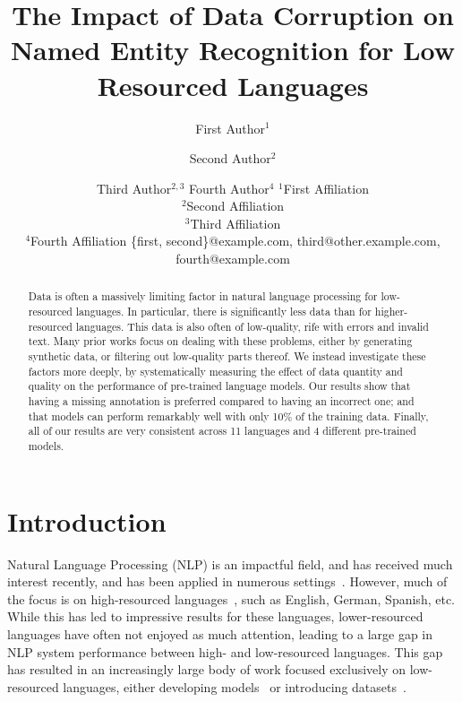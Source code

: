\documentclass{article}
\title{The Impact of Data Corruption on Named Entity Recognition for Low Resourced Languages}
\author{
First Author$^1$
\and
Second Author$^2$\and
Third Author$^{2,3}$\And
Fourth Author$^4$
\affiliations
$^1$First Affiliation\\
$^2$Second Affiliation\\
$^3$Third Affiliation\\
$^4$Fourth Affiliation
\emails
\{first, second\}@example.com,
third@other.example.com,
fourth@example.com
}
\begin{document}
\maketitle

\begin{abstract}
    Data is often a massively limiting factor in natural language processing for low-resourced languages. In particular, there is significantly less data than for higher-resourced languages. This data is also often of low-quality, rife with errors and invalid text. Many prior works focus on dealing with these problems, either by generating synthetic data, or filtering out low-quality parts thereof. We instead investigate these factors more deeply, by systematically measuring the effect of data quantity and quality on the performance of pre-trained language models. Our results show that having a missing annotation is preferred compared to having an incorrect one; and that models can perform remarkably well with only 10\% of the training data. Finally, all of our results are very consistent across 11 languages and 4 different pre-trained models.
\end{abstract}

\section{Introduction}
Natural Language Processing (NLP) is an impactful field, and has received much interest recently, and has been applied in numerous settings~\citep{vaswani2017Attention,conneau2019Unsupervised}.
However, much of the focus is on high-resourced languages~\citep{vaswani2017Attention,conneau2019Unsupervised,radford2018Improving,radford2019language_gpt2}, such as English, German, Spanish, etc. While this has led to impressive results for these languages, lower-resourced languages have often not enjoyed as much attention, leading to a large gap in NLP system performance between high- and low-resourced languages. This gap has resulted in an increasingly large body of work focused exclusively on low-resourced languages, either developing models~\citep{ogueji2021Small,alabi2022Multilingual} or introducing datasets~\citep{oyewusi2021Naijaner,adelani2021MasakhaNER,adelani2022Thousand,adelani2022Masakhaner}.

\end{document}
